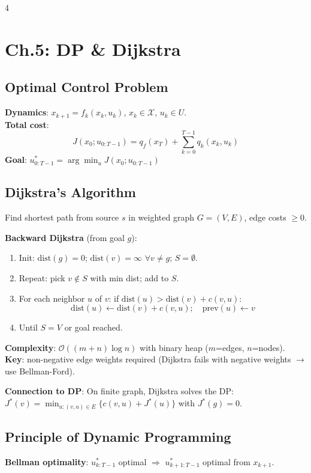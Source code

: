 \documentclass[8pt,landscape]{article}
\begin{document}
\begin{multicols}{4}
\section{Ch.5: DP \& Dijkstra}

\subsection{Optimal Control Problem}
\textbf{Dynamics}: $x_{k+1}=f_k(x_k,u_k)$, $x_k\in\mathcal{X}$, $u_k\in U$.\\
\textbf{Total cost}:
\[J(x_0;u_{0:T-1})=q_f(x_T)+\sum_{k=0}^{T-1}q_k(x_k,u_k)\]
\textbf{Goal}: $u^*_{0:T-1}=\arg\min_u J(x_0;u_{0:T-1})$

\subsection{Dijkstra's Algorithm}
Find shortest path from source $s$ in weighted graph $G=(V,E)$, edge costs $\ge 0$.

\textbf{Backward Dijkstra} (from goal $g$):
\begin{enumerate}
  \item Init: $\text{dist}(g)=0$; $\text{dist}(v)=\infty$ $\forall v\ne g$; $S=\emptyset$.
  \item Repeat: pick $v\notin S$ with min dist; add to $S$.
  \item For each neighbor $u$ of $v$: if $\text{dist}(u)>\text{dist}(v)+c(v,u)$:
        \[\text{dist}(u)\leftarrow\text{dist}(v)+c(v,u);\quad \text{prev}(u)\leftarrow v\]
  \item Until $S=V$ or goal reached.
\end{enumerate}
\textbf{Complexity}: $\mathcal{O}((m+n)\log n)$ with binary heap ($m$=edges, $n$=nodes).\\
\textbf{Key}: non-negative edge weights required (Dijkstra fails with negative weights $\to$ use Bellman-Ford).

\textbf{Connection to DP}: On finite graph, Dijkstra solves the DP:\\
$J^*(v)=\min_{u:(v,u)\in E}\{c(v,u)+J^*(u)\}$ with $J^*(g)=0$.

\subsection{Principle of Dynamic Programming}
\textbf{Bellman optimality}: $u_{k:T-1}^*$ optimal $\Rightarrow$ $u_{k+1:T-1}^*$ optimal from $x_{k+1}$.


\end{multicols}
\end{document}
